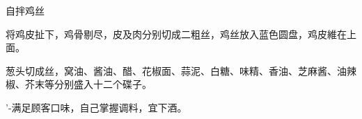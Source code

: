 \begin{recipe}{自拌鸡丝}

\ingredients



\cooking

\step 将鸡皮扯下，鸡骨剔尽，皮及肉分别切成二粗丝，鸡丝放入蓝色圆盘，鸡皮維在上面。

\step 葱头切成丝，窝油、酱油、醋、花椒面、蒜泥、白糖、味精、香油、芝麻酱、油辣椒、芥末等分别盛入十二个碟子。

\notes

'-满足顾客口味，自己掌握调料，宜下酒。

\end{recipe}

